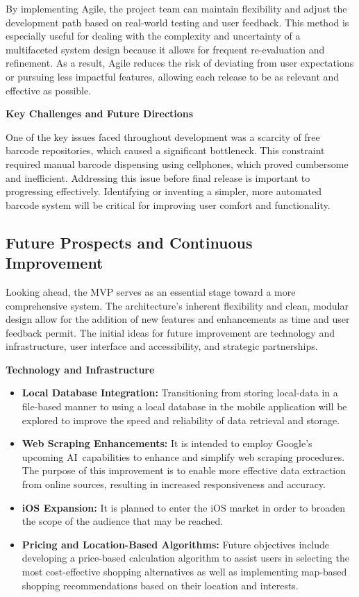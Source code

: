 \pagebreak

By implementing Agile, the project team can maintain flexibility and adjust the development path based on real-world testing and user feedback. This method is especially useful for dealing with the complexity and uncertainty of a multifaceted system design because it allows for frequent re-evaluation and refinement. As a result, Agile reduces the risk of deviating from user expectations or pursuing less impactful features, allowing each release to be as relevant and effective as possible. \cite{agile}

\noindent\textbf{Key Challenges and Future Directions}

One of the key issues faced throughout development was a scarcity of free barcode repositories, which caused a significant bottleneck. This constraint required manual barcode dispensing using cellphones, which proved cumbersome and inefficient. Addressing this issue before final release is important to progressing effectively. Identifying or inventing a simpler, more automated barcode system will be critical for improving user comfort and functionality.

\subsection{Future Prospects and Continuous Improvement}

Looking ahead, the MVP serves as an essential stage toward a more comprehensive system. The architecture's inherent flexibility and clean, modular design allow for the addition of new features and enhancements as time and user feedback permit. The initial ideas for future improvement are technology and infrastructure, user interface and accessibility, and strategic partnerships.

\noindent\textbf{Technology and Infrastructure}

\begin{itemize}
	\item \textbf{Local Database Integration:} Transitioning from storing local-data in a file-based manner to using a local database in the mobile application will be explored to improve the speed and reliability of data retrieval and storage.
	\item \textbf{Web Scraping Enhancements:} It is intended to employ Google's upcoming AI capabilities to enhance and simplify web scraping procedures. The purpose of this improvement is to enable more effective data extraction from online sources, resulting in increased responsiveness and accuracy.
	\item \textbf{iOS Expansion:} It is planned to enter the iOS market in order to broaden the scope of the audience that may be reached.
	\item \textbf{Pricing and Location-Based Algorithms:} Future objectives include developing a price-based calculation algorithm to assist users in selecting the most cost-effective shopping alternatives as well as implementing map-based shopping recommendations based on their location and interests.
\end{itemize}

